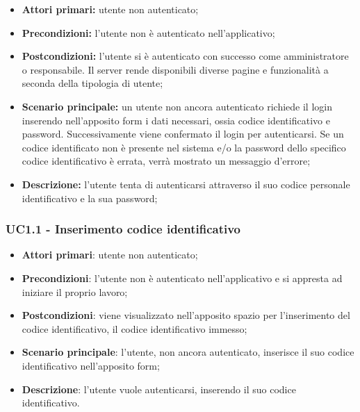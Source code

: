 \begin{itemize}
	\item 	\textbf{Attori primari:} utente non autenticato;
	\item 	\textbf{Precondizioni:} l'utente non è autenticato nell'applicativo;
	\item 	\textbf{Postcondizioni:}	l'utente si è autenticato con successo come amministratore o responsabile. Il server rende disponibili diverse pagine e funzionalità a seconda della tipologia di utente;
	\item 	\textbf{Scenario principale:} un utente non ancora autenticato richiede il login inserendo nell'apposito form i dati necessari, ossia codice identificativo e password. Successivamente viene confermato il login per autenticarsi. Se un codice identificato non è presente nel sistema e/o la password dello specifico codice identificativo è errata, verrà mostrato un messaggio d'errore;
	\item 	\textbf{Descrizione:} l'utente tenta di autenticarsi attraverso il suo codice personale identificativo e la sua password;
\end{itemize}

\subsubsection{UC1.1 - Inserimento codice identificativo}
\begin{itemize}
	\item \textbf{Attori primari}: utente non autenticato;
\item \textbf{Precondizioni}: l'utente non è autenticato nell'applicativo e si appresta ad iniziare il proprio lavoro;
\item \textbf{Postcondizioni}: viene visualizzato nell'apposito spazio per l'inserimento del codice identificativo, il codice identificativo immesso;
\item \textbf{Scenario principale}: l'utente, non ancora autenticato, inserisce il suo codice identificativo nell'apposito form;
\item \textbf{Descrizione}: l'utente vuole autenticarsi, inserendo il suo codice identificativo.
\end{itemize}

